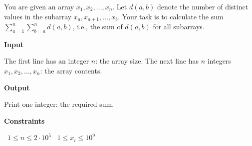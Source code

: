 You are given an array $x_1,x_2,\dots,x_n$. Let $d(a,b)$ denote the number of distinct values in the subarray $x_a,x_{a+1},\dots,x_b$.
Your task is to calculate the sum $\sum_{a=1}^n \sum_{b=a}^n d(a,b)$, i.e., the sum of $d(a,b)$ for all subarrays.

\vspace{0.3cm}\noindent\textbf{Input}

The first line has an integer $n$: the array size.
The next line has $n$ integers $x_1,x_2,\dots,x_n$: the array contents.

\vspace{0.3cm}\noindent\textbf{Output}

Print one integer: the required sum.

\vspace{0.3cm}\noindent\textbf{Constraints}

\textbullet\ $1 \le n \le 2 \cdot 10^5$
\textbullet\ $1 \le x_i \le 10^9$